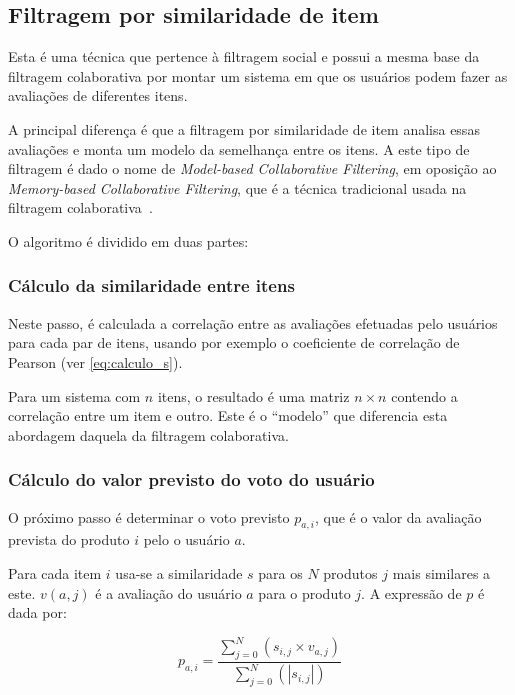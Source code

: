 
\subsection{Filtragem por similaridade de item}

Esta é uma técnica que pertence à filtragem social e possui a mesma base da filtragem colaborativa por montar um sistema em que os usuários podem fazer as avaliações de diferentes itens.

A principal diferença é que a filtragem por similaridade de item analisa essas avaliações e monta um modelo da semelhança entre os itens. A este tipo de filtragem é dado o nome de \textit{Model-based Collaborative Filtering}, em oposição ao \textit{Memory-based Collaborative Filtering}, que é a técnica tradicional usada na filtragem colaborativa~\cite{sarwar01}.

O algoritmo é dividido em duas partes:

\subsubsection{Cálculo da similaridade entre itens}

Neste passo, é calculada a correlação entre as avaliações efetuadas pelo usuários para cada par de itens, usando por exemplo o coeficiente de correlação de Pearson (ver \ref{eq:calculo_s}).

Para um sistema com $n$ itens, o resultado é uma matriz $n \times n$ contendo a correlação entre um item e outro. Este é o ``modelo'' que diferencia esta abordagem daquela da filtragem colaborativa.

\subsubsection{Cálculo do valor previsto do voto do usuário}

O próximo passo é determinar o voto previsto $p_{a,i}$, que é o valor da avaliação prevista do produto $i$ pelo o usuário $a$.

Para cada item $i$ usa-se a similaridade $s$ para os $N$ produtos $j$ mais similares a este. $v(a,j)$ é a avaliação do usuário $a$ para o produto $j$. A expressão de $p$ é dada por:

\begin{equation}
 p_{a,i} = \frac{\sum_{j=0}^N{(s_{i,j} \times v_{a, j})}}{\sum_{j=0}^N{(|s_{i,j}|)}}
 \label{eq:filtragem_item_based} 
\end{equation}

